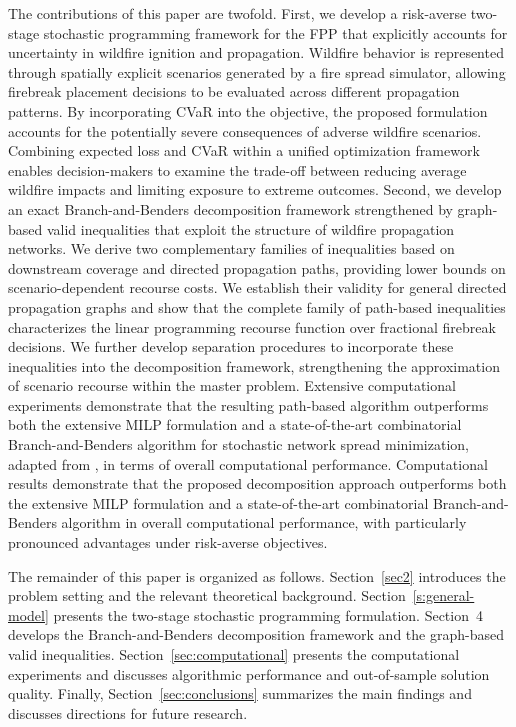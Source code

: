 \documentclass[a4paper,fleqn]{cas-sc}
\begin{document}
The contributions of this paper are twofold. First, we develop a risk-averse two-stage stochastic
programming framework for the FPP that explicitly
accounts for uncertainty in wildfire ignition and
propagation. Wildfire behavior is represented through
spatially explicit scenarios generated by a fire
spread simulator, allowing firebreak placement
decisions to be evaluated across different propagation
patterns. By incorporating CVaR into the objective,
the proposed formulation accounts for the potentially
severe consequences of adverse wildfire scenarios.
Combining expected loss and CVaR within a unified
optimization framework enables decision-makers to
examine the trade-off between reducing average
wildfire impacts and limiting exposure to extreme
outcomes. Second, we develop an exact Branch-and-Benders
decomposition framework strengthened by graph-based
valid inequalities that exploit the structure of
wildfire propagation networks. We derive two
complementary families of inequalities based on
downstream coverage and directed propagation paths,
providing lower bounds on scenario-dependent
recourse costs. We establish their validity for
general directed propagation graphs and show that
the complete family of path-based inequalities
characterizes the linear programming recourse
function over fractional firebreak decisions.
We further develop separation procedures to
incorporate these inequalities into the decomposition
framework, strengthening the approximation of
scenario recourse within the master problem.
Extensive computational experiments demonstrate
that the resulting path-based algorithm outperforms
both the extensive MILP formulation and a
state-of-the-art combinatorial Branch-and-Benders
algorithm for stochastic network spread minimization,
adapted from \citet{taninmics2024benders}, in
terms of overall computational performance. Computational results demonstrate that the proposed
decomposition approach outperforms both the extensive
MILP formulation and a state-of-the-art combinatorial
Branch-and-Benders algorithm in overall computational
performance, with particularly pronounced advantages
under risk-averse objectives.

The remainder of this paper is organized as follows.
Section~\ref{sec2} introduces the problem setting
and the relevant theoretical background.
Section~\ref{s:general-model} presents the two-stage
stochastic programming formulation. Section~4
develops the Branch-and-Benders decomposition
framework and the graph-based valid inequalities.
Section~\ref{sec:computational} presents the
computational experiments and discusses algorithmic
performance and out-of-sample solution quality.
Finally, Section~\ref{sec:conclusions} summarizes
the main findings and discusses directions for
future research.
\end{document}

